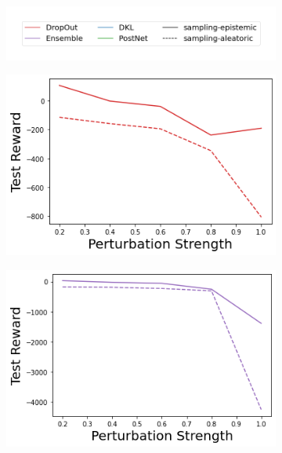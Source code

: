 \begin{figure}
    \centering
        \vspace{-3mm}
    \begin{subfigure}{.45\textwidth}
        \includegraphics[width=\textwidth]{sections/011_icml2022/resources/sampling-legend.png}
    \end{subfigure}
    \vspace{-3mm}
    
    \begin{subfigure}{.245\textwidth}
        \includegraphics[width=\textwidth]{sections/011_icml2022/resources/transition_shift-DropOut-LunarLanderShift-v0-mean_reward_.png}
    \end{subfigure}
    \begin{subfigure}{.245\textwidth}
        \includegraphics[width=\textwidth]{sections/011_icml2022/resources/transition_shift-Ensemble-LunarLanderShift-v0-mean_reward_.png}

\end{subfigure}
\end{figure}
